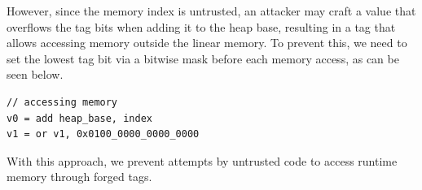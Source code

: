 However, since the memory index is untrusted, an attacker may craft a value that overflows the tag bits when adding it to the heap base, resulting in a tag that allows accessing memory outside the linear memory.
To prevent this, we need to set the lowest tag bit via a bitwise mask before each memory access, as can be seen below.

\begin{lstlisting}[frame=h,style=customc,
    label={lst:generated-code-mem-access}]
// accessing memory
v0 = add heap_base, index
v1 = or v1, 0x0100_0000_0000_0000
\end{lstlisting}

With this approach, we prevent attempts by untrusted code to access runtime memory through forged tags.

